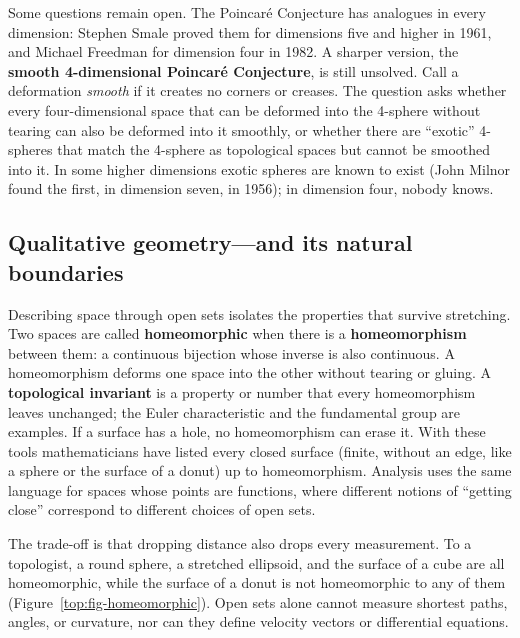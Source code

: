 \begin{historybox}
Some questions remain open. The Poincar\'e Conjecture has analogues in every dimension: Stephen Smale proved them for dimensions five and higher in 1961, and Michael Freedman for dimension four in 1982. A sharper version, the \textbf{smooth 4-dimensional Poincar\'e Conjecture}, is still unsolved. Call a deformation \emph{smooth} if it creates no corners or creases. The question asks whether every four-dimensional space that can be deformed into the 4-sphere without tearing can also be deformed into it smoothly, or whether there are ``exotic'' 4-spheres that match the 4-sphere as topological spaces but cannot be smoothed into it. In some higher dimensions exotic spheres are known to exist (John Milnor found the first, in dimension seven, in 1956); in dimension four, nobody knows.
\end{historybox}

\subsection{Qualitative geometry---and its natural boundaries}

Describing space through open sets isolates the properties that survive stretching. Two spaces are called \textbf{homeomorphic} when there is a \textbf{homeomorphism} between them: a continuous bijection whose inverse is also continuous. A homeomorphism deforms one space into the other without tearing or gluing. A \textbf{topological invariant} is a property or number that every homeomorphism leaves unchanged; the Euler characteristic and the fundamental group are examples. If a surface has a hole, no homeomorphism can erase it. With these tools mathematicians have listed every closed surface (finite, without an edge, like a sphere or the surface of a donut) up to homeomorphism. Analysis uses the same language for spaces whose points are functions, where different notions of ``getting close'' correspond to different choices of open sets.

The trade-off is that dropping distance also drops every measurement. To a topologist, a round sphere, a stretched ellipsoid, and the surface of a cube are all homeomorphic, while the surface of a donut is not homeomorphic to any of them (Figure~\ref{top:fig-homeomorphic}). Open sets alone cannot measure shortest paths, angles, or curvature, nor can they define velocity vectors or differential equations.

